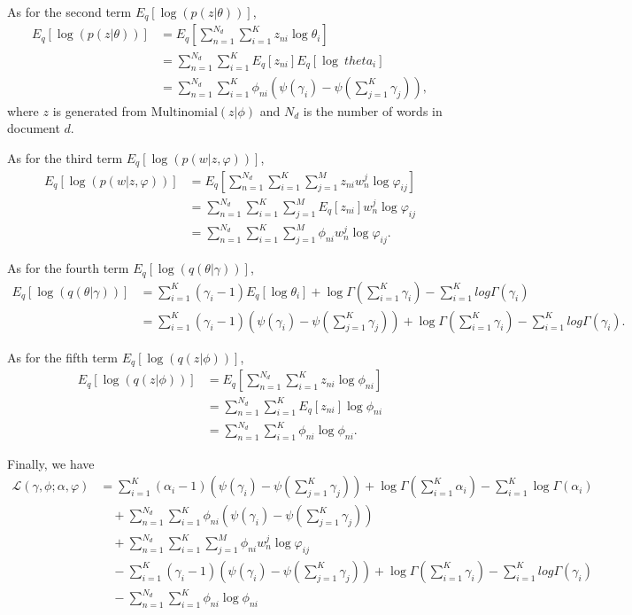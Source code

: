 \documentclass{article}
\begin{document}
As for the second term $ E_q[\log(p(z | \theta))] $,
\begin{align*}
	E_q[\log(p(z | \theta))] &= E_q[\sum^{N_d}_{n=1}\sum^{K}_{i=1}z_{ni}\log \theta_i] \\
	&= \sum^{N_d}_{n=1}\sum^{K}_{i=1}E_q[z_{ni}] E_q[\log\ theta_i] \\
	&= \sum^{N_d}_{n=1}\sum^{K}_{i=1} \phi_{ni}(\psi(\gamma_i) - \psi(\sum^{K}_{j=1}\gamma_j)),
\end{align*}
where $ z $ is generated from $ \mathrm{Multinomial}(z|\phi) $ and $ N_d $ is the number of words in document $ d $.

As for the third term $ E_q[\log(p(w | z, \varphi))] $,
\begin{align*}
	E_q[\log(p(w | z, \varphi))] &= E_q[\sum^{N_d}_{n=1}\sum^{K}_{i=1}\sum^{M}_{j=1} z_{ni} w^{j}_{n}\log\varphi_{ij}] \\
	&= \sum^{N_d}_{n=1}\sum^{K}_{i=1}\sum^{M}_{j=1}E_q[z_{ni}]w^{j}_{n}\log\varphi_{ij} \\
	&= \sum^{N_d}_{n=1}\sum^{K}_{i=1}\sum^{M}_{j=1}\phi_{ni}w^{j}_{n}\log\varphi_{ij}.
\end{align*}

As for the fourth term $ E_q[\log(q(\theta | \gamma))] $,
\begin{align*}
	E_q[\log(q(\theta | \gamma))] &= \sum^{K}_{i=1}(\gamma_i-1) E_q[\log\theta_i] + \log\Gamma(\sum^{K}_{i=1}\gamma_i) - \sum^{K}_{i=1}log\Gamma(\gamma_i) \\
	&= \sum^{K}_{i=1}(\gamma_i-1)(\psi(\gamma_i) - \psi(\sum^{K}_{j=1}\gamma_j)) + \log\Gamma(\sum^{K}_{i=1}\gamma_i) - \sum^{K}_{i=1}log\Gamma(\gamma_i).
\end{align*}

As for the fifth term $ E_q[\log(q(z|\phi))] $,
\begin{align*}
	E_q[\log(q(z | \phi))] &= E_q[\sum^{N_d}_{n=1}\sum^{K}_{i=1}z_{ni}\log\phi_{ni}] \\
	&= \sum^{N_d}_{n=1}\sum^{K}_{i=1}E_q[z_{ni}]\log\phi_{ni} \\
	&= \sum^{N_d}_{n=1}\sum^{K}_{i=1}\phi_{ni}\log\phi_{ni}.
\end{align*}

Finally, we have
\begin{align*}
\mathcal{L}( \gamma, \phi; \alpha, \varphi) &= \sum^{K}_{i=1}(\alpha_i - 1)(\psi(\gamma_i) - \psi(\sum^{K}_{j=1} \gamma_j)) + \log \Gamma(\sum^{K}_{i=1} \alpha_i) - \sum^{K}_{i=1}\log \Gamma(\alpha_i) \\
&\quad + \sum^{N_d}_{n=1}\sum^{K}_{i=1} \phi_{ni}(\psi(\gamma_i) - \psi(\sum^{K}_{j=1}\gamma_j)) \\
&\quad + \sum^{N_d}_{n=1}\sum^{K}_{i=1}\sum^{M}_{j=1}\phi_{ni}w^{j}_{n}\log\varphi_{ij} \\
&\quad - \sum^{K}_{i=1}(\gamma_i-1)(\psi(\gamma_i) - \psi(\sum^{K}_{j=1}\gamma_j)) + \log\Gamma(\sum^{K}_{i=1}\gamma_i) - \sum^{K}_{i=1}log\Gamma(\gamma_i) \\
&\quad - \sum^{N_d}_{n=1}\sum^{K}_{i=1}\phi_{ni}\log\phi_{ni} 
\end{align*}
\end{document}
